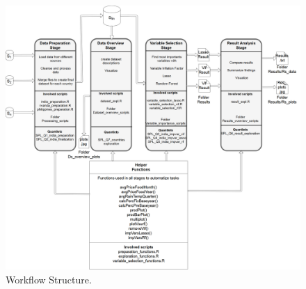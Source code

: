 \documentclass[12pt,a4paper,english]{article}
\begin{document}
\FloatBarrier
\begin{figure}[!htb]
\begin{center}
\includegraphics[scale=0.27]{figure1.png}
\caption{Workflow Structure.}
\label{figure1}
\end{center}
\end{figure}
\FloatBarrier
\end{document}
